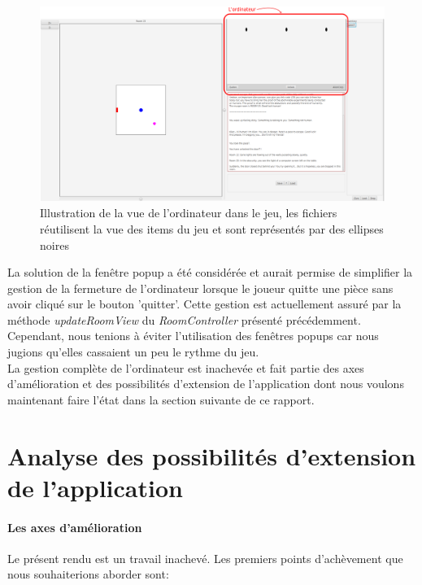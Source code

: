 \documentclass[./standalone.tex]{subfiles}
\begin{document}
\begin{center}
	\begin{figure}[h!]
	\advance\leftskip-0.6cm
	\includegraphics[scale=0.25]{images/ordinateur.png}
	\caption{Illustration de la vue de l'ordinateur dans le jeu, les fichiers réutilisent la vue des items du jeu et sont représentés par des ellipses noires}
	\end{figure}
\end{center}

La solution de la fenêtre popup a été considérée et aurait permise de simplifier la gestion de la fermeture de l'ordinateur lorsque le joueur quitte une pièce sans avoir cliqué sur le bouton 'quitter'. Cette gestion est actuellement assuré par la méthode \textit{updateRoomView} du \textit{RoomController} présenté précédemment.\\

Cependant, nous tenions à éviter l'utilisation des fenêtres popups car nous jugions qu'elles cassaient un peu le rythme du jeu.\\

La gestion complète de l'ordinateur est inachevée et fait partie des axes d'amélioration et des possibilités d'extension de l'application dont nous voulons maintenant faire l'état dans la section suivante de ce rapport.

\newpage

\section{Analyse des possibilités d’extension de l’application}
\medskip

\paragraph{Les axes d'amélioration\\}
Le présent rendu est un travail inachevé. Les premiers points d'achèvement que nous souhaiterions aborder sont:
\end{document}
